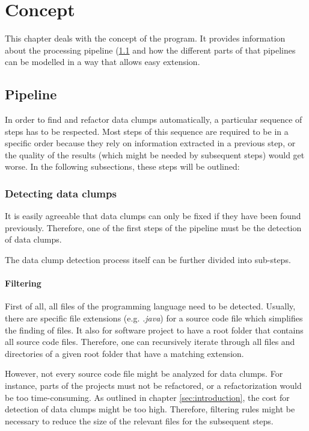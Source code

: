 \begingroup
\renewcommand{\cleardoublepage}{} %
\renewcommand{\clearpage}{}
\chapter{Concept}\label{chapter_conception}
\endgroup
This chapter deals with the concept of the program. It provides information about the processing pipeline (\ref{chapter:pipeline} and how the different parts of that pipelines can be modelled in a way that allows easy extension. 


\hfill
\section{Pipeline}\label{chapter:pipeline}
In order to find and refactor data clumps automatically, a particular sequence of steps has to be respected. Most steps of this sequence are required to be in a specific order because they rely on information extracted in a previous step, or the quality of the results (which might be needed by subsequent steps) would get worse. In the following subsections, these steps will be outlined:

\subsection{Detecting data clumps}\label{subsec:chap3_data_clump_detection}
It is easily agreeable that data clumps can only be fixed if they have been found previously. Therefore, one of the first steps of the pipeline must be the detection of data clumps. 

The data clump detection process itself can be further divided into sub-steps.
\subsubsection{Filtering}\label{subsub:filtering_files}
First of all, all files of the programming language need to be detected. Usually, there are specific file extensions (e.g. \textit{.java}) for a source code file which simplifies the finding of files. It also for software project to have a root folder that contains all source code files. Therefore, one can recursively iterate through all files and directories of a given root folder that have a matching extension. 

However, not every source code file might be analyzed for data clumps. For instance, parts of the projects must not be refactored, or a refactorization would be too time-consuming. As outlined in chapter \ref{sec:introduction}, the cost for detection of data clumps might be too high. Therefore, filtering rules might be necessary to reduce the size of the relevant files for the subsequent steps.  

